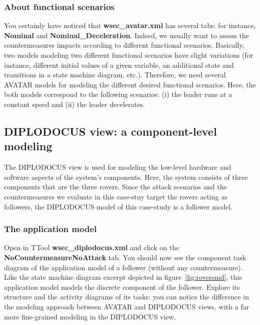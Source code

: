\documentclass{article}
\begin{document}
\subsubsection{About functional scenarios}

You certainly have noticed that \textbf{wsec\_avatar.xml} has several tabs: for instance, \textbf{Nominal} and \textbf{Nominal\_Deceleration}. Indeed, we usually want to assess the countermeasures impacts according to different functional scenarios. Basically, two models modeling two different functional scenarios have slight variations (for instance, different initial values of a given variable, an additional state and transitions in a state machine diagram, etc.). Therefore, we need several AVATAR models for modeling the different desired functional scenarios. Here, the both models correspond to the following scenarios: (i) the leader runs at a constant speed and (ii) the leader decelerates.


\subsection{DIPLODOCUS view: a component-level modeling}

The DIPLODOCUS view is used for modeling the low-level hardware and software aspects of the system's components. Here, the system consists of three components that are the three rovers. Since the attack scenarios and the countermeasures we evaluate in this case-stuy target the rovers acting as followers, the DIPLODOCUS model of this case-study is a follower model.

\subsubsection{The application model}

Open in TTool \textbf{wsec\_diplodocus.xml} and click on the \textbf{NoCountermeasureNoAttack} tab. You should now see the component task diagram of the application model of a follower (without any countermeasure). Like the state machine diagram excerpt depicted in figure~\ref{fig:roversmd}, this application model models the discrete component of the follower. Explore its structure and the activity diagrams of its tasks: you can notice the difference in the modeling approach between AVATAR and DIPLODOCUS views, with a far more fine-grained modeling in the DIPLODOCUS view.
\end{document}
